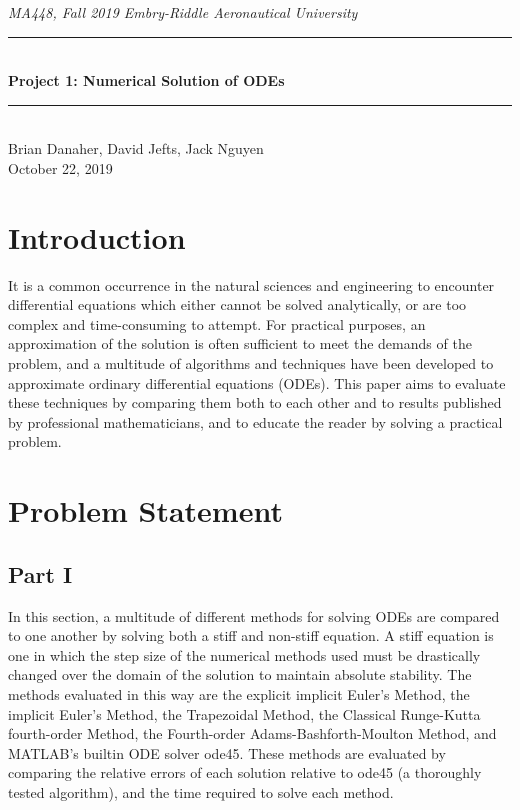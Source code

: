 \documentclass[11pt]{article}
\newcommand{\horrule}[1]{\rule{\linewidth}{#1}}      %
\begin{document}
\begin{center}
{\it MA448, Fall 2019  \hfill Embry-Riddle Aeronautical University
 }\\
\horrule{0.5pt} \\[0.4cm]
{\bf \Large  %
Project 1: Numerical Solution of ODEs
}\\
\horrule{2pt} \\[5cm]
Brian Danaher, David Jefts, Jack Nguyen
\\[0.4cm]
October 22, 2019 %
\end{center}
\thispagestyle{empty}
\newpage
\tableofcontents 
\newpage
\section{Introduction}\label{S:1}
It is a common occurrence in the natural sciences and engineering to encounter
differential equations which either cannot be solved analytically, or are too 
complex and time-consuming to attempt. For practical purposes, an approximation
of the solution is often sufficient to meet the demands of the problem, and a
multitude of algorithms and techniques have been developed to approximate 
ordinary differential equations (ODEs). This paper aims to evaluate these techniques by 
comparing them both to each other and to results published by professional mathematicians, 
and to educate the reader by solving a practical problem.
\section{Problem Statement}\label{S:2}
\subsection{Part I}\label{S:2.1}
%
In this section, a multitude of different methods for solving ODEs are compared 
to one another by solving both a stiff and non-stiff equation. A stiff equation
is one in which the step size of the numerical methods used must be drastically
changed over the domain of the solution to maintain absolute stability. The 
methods evaluated in this way are the explicit implicit Euler's Method, the
implicit Euler's Method, the Trapezoidal Method, the Classical Runge-Kutta 
fourth-order Method, the Fourth-order Adams-Bashforth-Moulton Method, and MATLAB's
builtin ODE solver ode45. These methods are evaluated by comparing the relative
errors of each solution relative to ode45 (a thoroughly tested algorithm), and 
the time required to solve each method.
\end{document}
